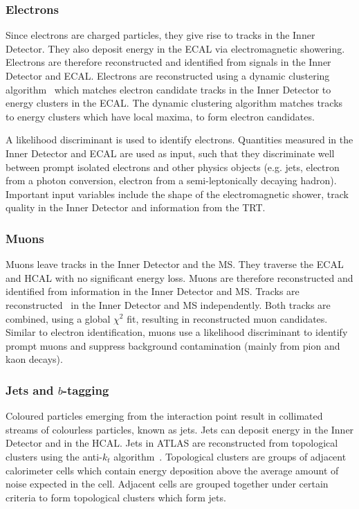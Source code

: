 \subsubsection{Electrons}
Since electrons are charged particles, they give rise to tracks in the Inner Detector. They also deposit energy in the ECAL via electromagnetic showering. Electrons are therefore reconstructed and identified from signals in the Inner Detector and ECAL. Electrons are reconstructed using a dynamic clustering algorithm~\cite{electronRecoAndID:paper} which matches electron candidate tracks in the Inner Detector to energy clusters in the ECAL. The dynamic clustering algorithm matches tracks to energy clusters which have local maxima, to form electron candidates.

A likelihood discriminant is used to identify electrons. Quantities measured in the Inner Detector and ECAL are used as input, such that they discriminate well between prompt isolated electrons and other physics objects (e.g. jets, electron from a photon conversion, electron from a semi-leptonically decaying hadron). Important input variables include the shape of the electromagnetic shower, track quality in the Inner Detector and information from the TRT.

\subsubsection{Muons}
Muons leave tracks in the Inner Detector and the MS. They traverse the ECAL and HCAL with no significant energy loss. Muons are therefore reconstructed and identified from information in the Inner Detector and MS. Tracks are reconstructed~\cite{muonIDEfficiency} in the Inner Detector and MS independently. Both tracks are combined, using a global $\chi^{2}$ fit, resulting in reconstructed muon candidates.\\

Similar to electron identification, muons use a likelihood discriminant to identify prompt muons and suppress background contamination (mainly from pion and kaon decays).

\subsubsection{Jets and $b$-tagging}
\label{sec:jets-btagging}
Coloured particles emerging from the interaction point result in collimated streams of colourless particles, known as jets. Jets can deposit energy in the Inner Detector and in the HCAL. Jets in ATLAS are reconstructed from topological clusters using the anti-$k_{t}$ algorithm~\cite{Cacciari:2008gp}. Topological clusters are groups of adjacent calorimeter cells which contain energy deposition above the average amount of noise expected in the cell. Adjacent cells are grouped together under certain criteria to form topological clusters which form jets.\\

